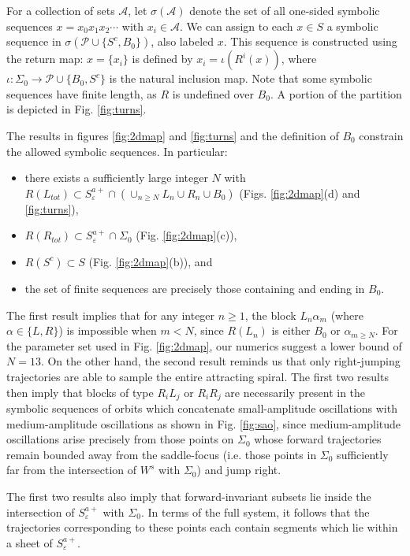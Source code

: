 \documentclass[aip, cha, sd, amsmath,amssymb, preprint]{revtex4-1}
\begin{document}
For a collection of sets $\mathcal{A}$, let $\sigma(\mathcal{A})$ denote the set of all one-sided symbolic sequences $x = x_0 x_1 x_2 \cdots$ with $x_i \in \mathcal{A}$. We can assign to each $x\in S$ a symbolic sequence in $\sigma(\mathcal{P}\cup \{S^c, B_0\})$, also labeled $x$. This sequence is constructed using the return map: $x = \{x_i\}$ is defined by $x_i = \iota(R^i(x))$, where $\iota: \Sigma_0 \to \mathcal{P}\cup\{B_0,S^c\}$ is the natural inclusion map. Note that some symbolic sequences have finite length, as $R$ is undefined over $B_0$. A portion of the partition is depicted in Fig. \ref{fig:turns}.

The results in figures \ref{fig:2dmap} and \ref{fig:turns} and the definition of $B_0$ constrain the allowed symbolic sequences. In particular:

\begin{itemize}
\item there exists a sufficiently large integer $N$ with $R(L_{tot}) \subset S^{a+}_{ \varepsilon} \cap (\cup_{n\geq N} L_n \cup R_n \cup B_0)$ (Figs. \ref{fig:2dmap}(d) and \ref{fig:turns}),
\item $R(R_{tot}) \subset S^{a+}_{ \varepsilon}\cap \Sigma_0$ (Fig. \ref{fig:2dmap}(c)),
\item $R(S^c) \subset S$ (Fig. \ref{fig:2dmap}(b)), and
\item the set of finite sequences are precisely those containing and ending in $B_0$.
\end{itemize}

The first result implies that for any integer $n \geq 1$, the block $L_n \alpha_m$ (where $\alpha \in \{L,R\}$) is impossible when $m < N$, since $R(L_n)$ is either $B_0$ or $\alpha_{m\geq N}$. For the parameter set used in Fig. \ref{fig:2dmap}, our numerics suggest a lower bound of $N = 13$. On the other hand, the second result reminds us that only right-jumping trajectories are able to sample the entire attracting spiral. The first two results then imply that blocks of type $R_i L_j$ or $R_i R_j$ are necessarily present in the symbolic sequences of orbits which concatenate small-amplitude oscillations with medium-amplitude oscillations as shown in Fig. \ref{fig:sao}, since medium-amplitude oscillations arise precisely from those points on $\Sigma_0$ whose forward trajectories remain bounded away from the saddle-focus (i.e. those points in $\Sigma_0$ sufficiently far from the intersection of $W^s$ with $\Sigma_0$) and jump right. 

The first two results also imply that forward-invariant subsets lie inside the intersection of $S^{a+}_{ \varepsilon}$ with $\Sigma_0$. In terms of the full system, it follows that the trajectories corresponding to these points each contain segments which lie  within a sheet of $S^{a+}_{ \varepsilon}$. 
	
\end{document}
